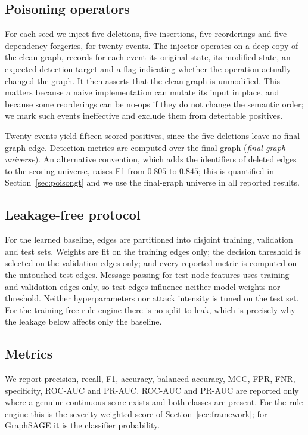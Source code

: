 \documentclass[journal]{IEEEtran}
\begin{document}
\subsection{Poisoning operators}
\label{sec:poisoning}
For each seed we inject five deletions, five insertions, five reorderings and
five dependency forgeries, for twenty events. The injector operates on a deep
copy of the clean graph, records for each event its original state, its modified
state, an expected detection target and a flag indicating whether the operation
actually changed the graph. It then asserts that the clean graph is unmodified.
This matters because a naive implementation can mutate its input in place, and
because some reorderings can be no-ops if they do not change the semantic order;
we mark such events ineffective and exclude them from detectable positives.

Twenty events yield fifteen scored positives, since the five deletions leave no
final-graph edge. Detection metrics are computed over the final graph
(\emph{final-graph universe}). An alternative convention, which adds the
identifiers of deleted edges to the scoring universe, raises F1 from $0.805$ to
$0.845$; this is quantified in Section~\ref{sec:poisongt} and we use the
final-graph universe in all reported results.

\subsection{Leakage-free protocol}
\label{sec:leakprotocol}
For the learned baseline, edges are partitioned into disjoint training,
validation and test sets. Weights are fit on the training edges only; the
decision threshold is selected on the validation edges only; and every reported
metric is computed on the untouched test edges. Message passing for test-node
features uses training and validation edges only, so test edges influence
neither model weights nor threshold. Neither hyperparameters nor attack
intensity is tuned on the test set. For the training-free rule engine there is
no split to leak, which is precisely why the leakage below affects only the
baseline.

\subsection{Metrics}
We report precision, recall, F1, accuracy, balanced accuracy, MCC, FPR, FNR,
specificity, ROC-AUC and PR-AUC. ROC-AUC and PR-AUC are reported only where a
genuine continuous score exists and both classes are present. For the rule
engine this is the severity-weighted score of Section~\ref{sec:framework}; for
GraphSAGE it is the classifier probability.
\end{document}
